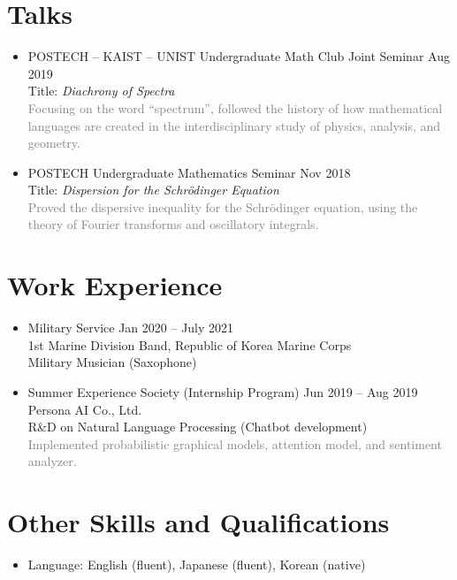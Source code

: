 \documentclass[11pt,a4paper]{article}
\begin{document}
\section*{Talks}
\begin{itemize}
\item
	POSTECH -- KAIST -- UNIST Undergraduate Math Club Joint Seminar
	\hfill{\small Aug 2019}\\
	Title: \emph{Diachrony of Spectra}\\
	\textcolor{gray}{Focusing on the word ``spectrum'', followed the history of how mathematical languages are created in the interdisciplinary study of physics, analysis, and geometry.}
\item
	POSTECH Undergraduate Mathematics Seminar
	\hfill{\small Nov 2018}\\
	Title: \emph{Dispersion for the Schr\"odinger Equation}\\
	\textcolor{gray}{Proved the dispersive inequality for the Schr\"odinger equation, using the theory of Fourier transforms and oscillatory integrals.}
\end{itemize}




\section*{Work Experience}
\begin{itemize}
\item
	Military Service
	\hfill{\small Jan 2020 -- July 2021}\\
	1st Marine Division Band, Republic of Korea Marine Corps\\
	Military Musician (Saxophone)
\item
	Summer Experience Society (Internship Program)
	\hfill{\small Jun 2019 -- Aug 2019}\\
	Persona AI Co., Ltd.\\
	R\&D on Natural Language Processing (Chatbot development)\\
	\textcolor{gray}{Implemented probabilistic graphical models, attention model, and sentiment analyzer.}
\end{itemize}





\section*{Other Skills and Qualifications}
\begin{itemize}
\item Language: English (fluent), Japanese (fluent), Korean (native)
\end{itemize}
	
\end{document}
